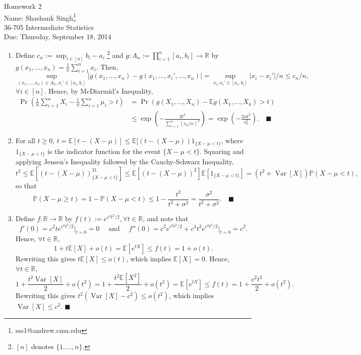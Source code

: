 \documentclass[11pt]{article}
\makeatletter
\newcommand{\myname}{Shashank Singh\footnote{sss1@andrew.cmu.edu}}
\newcommand{\myclass}{36-705 Intermediate Statistics}
\newcommand{\myhwnum}{2}
\newcommand{\duedate}{Thursday, September 18, 2014}
\renewcommand{\qed}{\quad \ensuremath{\blacksquare}}
\newcommand{\E}{\mathbb{E}} %
\newcommand{\pr}{\mathbb{P}} %
\newcommand{\Var}{\operatorname{Var}} %
\newcommand{\R}{\mathbb{R}} %
\makeatother
\begin{document}
\thispagestyle{plain}

{\Large Homework \myhwnum} \\
Name: \myname \\
\myclass \\
Due: \duedate

\begin{enumerate}
\item
Define $c_n := \sup_{i \in [n]} b_i - a_i$
\footnote{$[n]$ denotes $\{1,\dots,n\}$.}
and $g : A_n := \prod_{i = 1}^n [a_i, b_i] \to \R$ by
$g(x_1,\dots,x_n) = \frac{1}{n} \sum_{i = 1}^n x_i$. Then,
\[\sup_{(x_1,\dots,x_n) \in A_n, x_i' \in [a_i,b_i]}
                            |g(x_1,\dots,x_n) - g(x_1,\dots,x_i',\dots,x_n)|
    = \sup_{x_i,x_i' \in [a_i,b_i]} |x_i - x_i'|/n
    \leq c_n/n,
\]
$\forall i \in [n]$. Hence, by McDiarmid's Inequality,
\begin{align*}
\Pr \left( \frac{1}{n} \sum_{i = 1}^n X_i
                            - \frac{1}{n} \sum_{i = 1}^n \mu_i > t \right)
 &  = \Pr \left( g(X_1,\dots,X_n) - \E g(X_1,\dots,X_k) > t \right) \\
 &  \leq \exp \left( -\frac{2t^2}{\sum_{i = 1}^n (c_n/n)^2} \right)
    = \exp \left( -\frac{2nt^2}{c_n^2} \right). \qed
\end{align*}
 
\item For all $t \geq 0$,
$t = \E[t - (X - \mu)] \leq \E[(t - (X - \mu))1_{\{X - \mu < t\}}$,
where $1_{\{X - \mu < t\}}$ is the indicator function for the event
$\{X - \mu < t\}$. Squaring and applying Jensen's Inequality followed by
the Cauchy-Schwarz Inequality,
\[t^2
    \leq \E[(t - (X - \mu))^21_{\{X - \mu < t\}}]
    \leq \E[(t - (X - \mu))^2]\E[1_{\{X - \mu < t\}}]
    = (t^2 + \Var[X])\pr(X - \mu < t),
\]
so that
\[\pr(X - \mu \geq t)
    = 1 - \pr(X - \mu < t)
    \leq 1 - \frac{t^2}{t^2 + \sigma^2}
    = \frac{\sigma^2}{t^2 + \sigma^2}. \qed
\]

\item Define $f : \R \to \R$ by $f(t) := e^{c^2t^2/2}, \forall t \in \R$, and
note that
\[f'(0) = c^2te^{c^2t^2/2} \big|_{t = 0} = 0
    \quad \mbox{ and } \quad
    f''(0) = c^2e^{c^2t^2/2} + c^4t^2e^{c^2t^2/2} \big|_{t = 0} = c^2.
\]
Hence, $\forall t \in \R$,
\[1 + t\E[X] + o(t)
    = \E[e^{tX}]
    \leq f(t)
    = 1 + o(t).
\]
Rewriting this gives
$t\E[X] \leq o(t)$, which implies $\E[X] = 0$. Hence, $\forall t \in \R$,
\[1 + \frac{t^2\Var[X]}{2} + o(t^2)
    = 1 + \frac{t^2\E[X^2]}{2} + o(t^2)
    = \E[e^{tX}]
    \leq f(t)
    = 1 + \frac{c^2t^2}{2} + o(t^2).
\]
Rewriting this gives $t^2 (\Var[X] - c^2) \leq o(t^2)$, which implies
$\Var[X] \leq c^2$. \qed


\end{enumerate}
\end{document}
